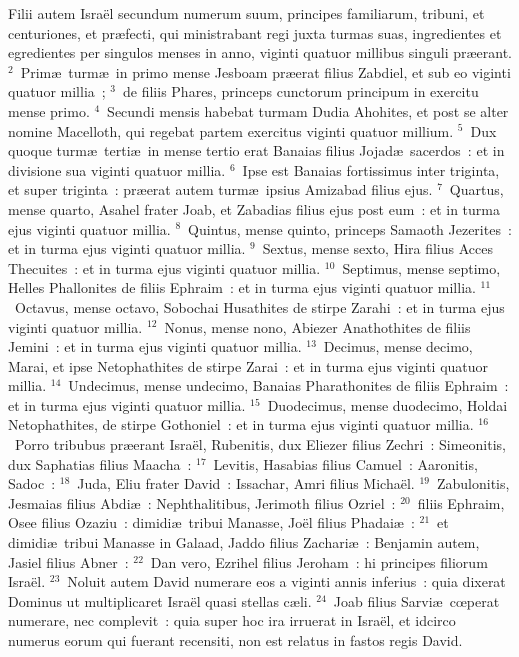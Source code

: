 \bchapter
\lettrine[lines=3,image=true,loversize=0.05,lraise=-0.03]{F}{}ilii autem Isra\"el secundum numerum suum, principes familiarum, tribuni, et centuriones, et pr\ae fecti, qui ministrabant regi juxta turmas suas, ingredientes et egredientes per singulos menses in anno, viginti quatuor millibus singuli pr\ae erant.
${}^{2}$~Prim\ae\ turm\ae\ in primo mense Jesboam pr\ae erat filius Zabdiel, et sub eo viginti quatuor millia~;
${}^{3}$~de filiis Phares, princeps cunctorum principum in exercitu mense primo.
${}^{4}$~Secundi mensis habebat turmam Dudia Ahohites, et post se alter nomine Macelloth, qui regebat partem exercitus viginti quatuor millium.
${}^{5}$~Dux quoque turm\ae\ terti\ae\ in mense tertio erat Banaias filius Jojad\ae\ sacerdos~: et in divisione sua viginti quatuor millia.
${}^{6}$~Ipse est Banaias fortissimus inter triginta, et super triginta~: pr\ae erat autem turm\ae\ ipsius Amizabad filius ejus.
${}^{7}$~Quartus, mense quarto, Asahel frater Joab, et Zabadias filius ejus post eum~: et in turma ejus viginti quatuor millia.
${}^{8}$~Quintus, mense quinto, princeps Samaoth Jezerites~: et in turma ejus viginti quatuor millia.
${}^{9}$~Sextus, mense sexto, Hira filius Acces Thecuites~: et in turma ejus viginti quatuor millia.
${}^{10}$~Septimus, mense septimo, Helles Phallonites de filiis Ephraim~: et in turma ejus viginti quatuor millia.
${}^{11}$~Octavus, mense octavo, Sobochai Husathites de stirpe Zarahi~: et in turma ejus viginti quatuor millia.
${}^{12}$~Nonus, mense nono, Abiezer Anathothites de filiis Jemini~: et in turma ejus viginti quatuor millia.
${}^{13}$~Decimus, mense decimo, Marai, et ipse Netophathites de stirpe Zarai~: et in turma ejus viginti quatuor millia.
${}^{14}$~Undecimus, mense undecimo, Banaias Pharathonites de filiis Ephraim~: et in turma ejus viginti quatuor millia.
${}^{15}$~Duodecimus, mense duodecimo, Holdai Netophathites, de stirpe Gothoniel~: et in turma ejus viginti quatuor millia.
${}^{16}$~Porro tribubus pr\ae erant Isra\"el, Rubenitis, dux Eliezer filius Zechri~: Simeonitis, dux Saphatias filius Maacha~:
${}^{17}$~Levitis, Hasabias filius Camuel~: Aaronitis, Sadoc~:
${}^{18}$~Juda, Eliu frater David~: Issachar, Amri filius Micha\"el.
${}^{19}$~Zabulonitis, Jesmaias filius Abdi\ae~: Nephthalitibus, Jerimoth filius Ozriel~:
${}^{20}$~filiis Ephraim, Osee filius Ozaziu~: dimidi\ae\ tribui Manasse, Jo\"el filius Phadai\ae~:
${}^{21}$~et dimidi\ae\ tribui Manasse in Galaad, Jaddo filius Zachari\ae~: Benjamin autem, Jasiel filius Abner~:
${}^{22}$~Dan vero, Ezrihel filius Jeroham~: hi principes filiorum Isra\"el.
${}^{23}$~Noluit autem David numerare eos a viginti annis inferius~: quia dixerat Dominus ut multiplicaret Isra\"el quasi stellas c\ae li.
${}^{24}$~Joab filius Sarvi\ae\ cœperat numerare, nec complevit~: quia super hoc ira irruerat in Isra\"el, et idcirco numerus eorum qui fuerant recensiti, non est relatus in fastos regis David.


